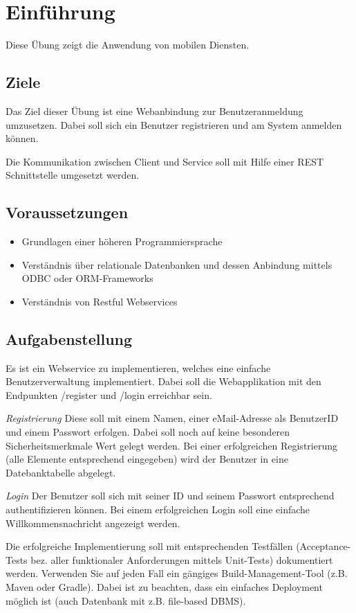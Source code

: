 \section{Einf\"uhrung}
Diese Übung zeigt die Anwendung von mobilen Diensten.
\subsection{Ziele}
Das Ziel dieser Übung ist eine Webanbindung zur Benutzeranmeldung umzusetzen. Dabei soll sich ein Benutzer registrieren und am System anmelden können.

Die Kommunikation zwischen Client und Service soll mit Hilfe einer REST Schnittstelle umgesetzt werden.

\subsection{Voraussetzungen}
\begin{itemize}
	\item Grundlagen einer höheren Programmiersprache
	\item Verständnis über relationale Datenbanken und dessen Anbindung mittels ODBC oder ORM-Frameworks
	\item Verständnis von Restful Webservices
\end{itemize}

\subsection{Aufgabenstellung}
Es ist ein Webservice zu implementieren, welches eine einfache Benutzerverwaltung implementiert. Dabei soll die Webapplikation mit den Endpunkten /register und /login erreichbar sein.

\textit{Registrierung}
Diese soll mit einem Namen, einer eMail-Adresse als BenutzerID und einem Passwort erfolgen. Dabei soll noch auf keine besonderen Sicherheitsmerkmale Wert gelegt werden. Bei einer erfolgreichen Registrierung (alle Elemente entsprechend eingegeben) wird der Benutzer in eine Datebanktabelle abgelegt.

\textit{Login}
Der Benutzer soll sich mit seiner ID und seinem Passwort entsprechend authentifizieren können. Bei einem erfolgreichen Login soll eine einfache Willkommensnachricht angezeigt werden.

Die erfolgreiche Implementierung soll mit entsprechenden Testfällen (Acceptance-Tests bez. aller funktionaler Anforderungen mittels Unit-Tests) dokumentiert werden. Verwenden Sie auf jeden Fall ein gängiges Build-Management-Tool (z.B. Maven oder Gradle). Dabei ist zu beachten, dass ein einfaches Deployment möglich ist (auch Datenbank mit z.B. file-based DBMS).

